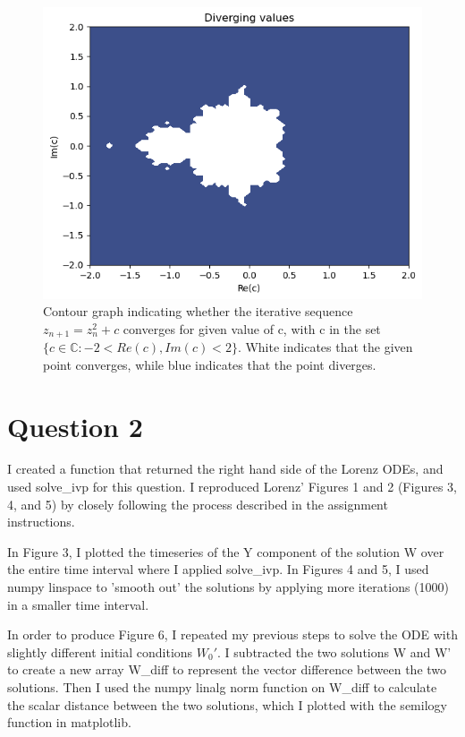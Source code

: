 \documentclass{article}
\begin{document}
\begin{multicols}{2}
\begin{figure} [H]
    \centering
    \includegraphics[width=1.0\linewidth]{Assignment 3 Images/download (1).png}
    \caption{Contour graph indicating whether the iterative sequence $z_{n+1} = z_{n}^2 + c$ converges for given value of c, with c in the set $\{c \in \mathbb{C} : -2 < Re(c), Im(c) < 2\}$. White indicates that the given point converges, while blue indicates that the point diverges.}
    \label{fig:enter-label}
\end{figure}

\section{Question 2}

I created a function that returned the right hand side of the Lorenz ODEs, and used solve\_ivp for this question. I reproduced Lorenz' Figures 1 and 2 (Figures 3, 4, and 5) by closely following the process described in the assignment instructions. 

In Figure 3, I plotted the timeseries of the Y component of the solution W over the entire time interval where I applied solve\_ivp. In Figures 4 and 5, I used numpy linspace to 'smooth out' the solutions by applying more iterations (1000) in a smaller time interval. 

In order to produce Figure 6, I repeated my previous steps to solve the ODE with slightly different initial conditions $W_0'$. I subtracted the two solutions W and W' to create a new array W\_diff to represent the vector difference between the two solutions. Then I used the numpy linalg norm function on W\_diff to calculate the scalar distance between the two solutions, which I plotted with the semilogy function in matplotlib. 


\end{multicols}
\end{document}
